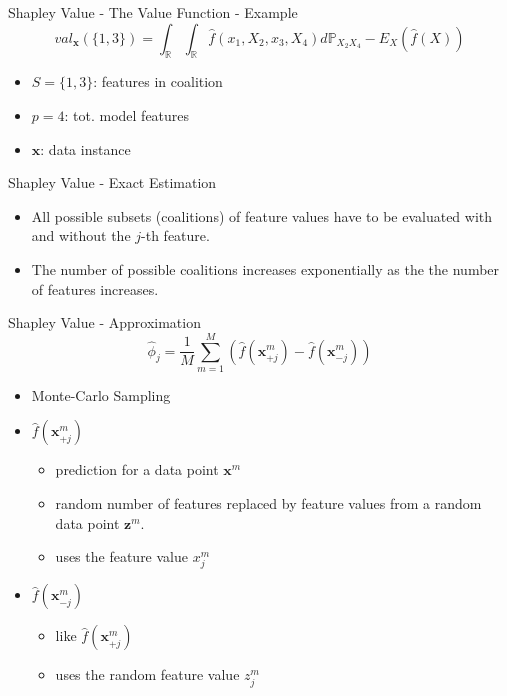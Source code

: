 \begin{frame}{Shapley Value - The Value Function - Example}
\begin{equation}
val_{\bm{x}}(\{1,3\})=\int_{\mathbb{R}}\int_{\mathbb{R}}\hat{f}(x_{1},X_{2},x_{3},X_{4})d\mathbb{P}_{X_2X_4}-E_X(\hat{f}(X))
\end{equation}
\begin{itemize}
	\item $S = \{1,3\}$: features in coalition
	\item $p = 4$: tot. model features
	\item $\bm{x}$: data instance
\end{itemize}
\end{frame}



\begin{frame}{Shapley Value - Exact Estimation}
	\begin{itemize}
		\item All possible subsets (coalitions) of feature values have to be evaluated with and without the $j$-th feature.
		\item The number of possible coalitions increases exponentially as the the number of features increases.
	\end{itemize}
\end{frame}
\begin{frame}{Shapley Value - Approximation\footnotemark}
\begin{equation}
	\hat{\phi}_{j}=\frac{1}{M}\sum_{m=1}^M\left(\hat{f}(\bm{x}^{m}_{+j})-\hat{f}(\bm{x}^{m}_{-j})\right)
\end{equation}
\begin{itemize}
	\item Monte-Carlo Sampling
	\item $\hat{f}(\bm{x}^{m}_{+j})$
	\begin{itemize}
		\item prediction for a data point $\bm{x}^m$
		\item random number of features replaced by feature values from a random data point $\bm{z}^m$.
		\item uses the feature value $x^m_j$
	\end{itemize}
	\item $\hat{f}(\bm{x}^{m}_{-j})$
	\begin{itemize}
		\item like $\hat{f}(\bm{x}^{m}_{+j})$
		\item uses the random feature value $z^m_j$
	\end{itemize}
\end{itemize}
\end{frame}
